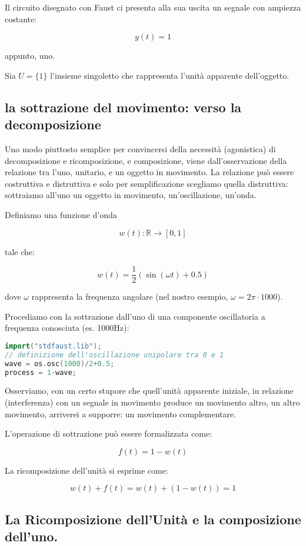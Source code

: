\documentclass{gs-adonis}
\begin{document}
Il circuito disegnato con Faust ci presenta alla sua uscita un segnale
con ampiezza costante:

\[y(t)=1\]

appunto, uno.

Sia \(U = \{1\}\) l'insieme singoletto che rappresenta l'unità apparente
dell'oggetto.

\subsection{la sottrazione del movimento: verso la
decomposizione}\label{la-sottrazione-del-movimento-verso-la-decomposizione}

Uno modo piuttosto semplice per convincersi della necessità (agonistica)
di decomposizione e ricomposizione, e composizione, viene
dall'osservazione della relazione tra l'uno, unitario, e un oggetto in
movimento. La relazione può essere costruttiva e distruttiva e solo per
semplificazione scegliamo quella distruttiva: sottraiamo all'uno un
oggetto in movimento, un'oscillazione, un'onda.

Definiamo una funzione d'onda

\[w(t): \mathbb{R} \to [0,1]\]

tale che:

\[w(t) = \frac{1}{2}(\sin(\omega t) + 0.5)\]

dove \(\omega\) rappresenta la frequenza angolare (nel nostro esempio,
\(\omega = 2\pi \cdot 1000\)).

Procediamo con la sottrazione dall'uno di una componente oscillatoria a
frequenza conosciuta (es. 1000Hz):

\begin{lstlisting}[language={C++}]
import("stdfaust.lib");
// definizione dell'oscillazione unipolare tra 0 e 1
wave = os.osc(1000)/2+0.5;
process = 1-wave;
\end{lstlisting}

Osserviamo, con un certo stupore che quell'unità apparente iniziale, in
relazione (interferenza) con un segnale in movimento produce un
movimento altro, un altro movimento, arriverei a supporre: un movimento
complementare.

L'operazione di sottrazione può essere formalizzata come:

\[f(t) = 1 - w(t)\]

La ricomposizione dell'unità si esprime come:

\[w(t) + f(t) = w(t) + (1 - w(t)) = 1\]

\subsection{La Ricomposizione dell'Unità e la composizione
dell'uno.}\label{la-ricomposizione-dellunituxe0-e-la-composizione-delluno.}
\end{document}
